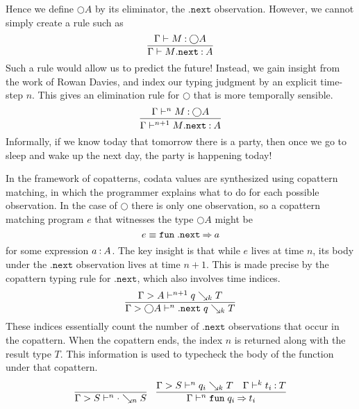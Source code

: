 \documentclass[11pt]{article}
\newcommand{\fun}{\mathtt{fun}}
\renewcommand{\circle}{\bigcirc}
\renewcommand{\next}{\mathtt{.next}}
\renewcommand{\synth}{\searrow}
\begin{document}
Hence we define $\circle A$ by its eliminator, the $\next$ observation.
However, we cannot simply create a rule such as
%
\begin{equation*}
  \infer{
    \Gamma \proves M\next \hastype A
  }{
    \Gamma \proves M \hastype \circle A
  }
\end{equation*}
%
Such a rule would allow us to predict the future!
%
Instead, we gain insight from the work of Rowan Davies\cite{davies-ltl}, and
index our typing judgment by an explicit time-step $n$.
This gives an elimination rule for $\circle$ that is more temporally sensible.
%
\begin{equation*}
  \infer{
    \Gamma \proves^{n+1} M\next \hastype A
  }{
    \Gamma \proves^n M \hastype \circle A
  }
\end{equation*}
%
Informally, if we know today that tomorrow there is a party, then once we go to
sleep and wake up the next day, the party is happening today!

In the framework of copatterns, codata values are synthesized using copattern
matching, in which the programmer explains what to do for each possible
observation.
In the case of $\circle$ there is only one observation, so a copattern matching
program $e$ that witnesses the type $\circle A$ might be
%
\begin{equation*}
  e \equiv \fun\;\next\goesto a
\end{equation*}
%
for some expression $a \mathbin{:} A$.
The key insight is that while $e$ lives at time $n$, its body under the $\next$
observation lives at time $n+1$.
This is made precise by the copattern typing rule for $\next$, which also
involves time indices.
%
\begin{equation*}
  \infer{
    \Gamma > \circle A \proves^n \next\; q \synth_k T
  }{
    \Gamma > A \proves^{n+1} q \synth_k T
  }
\end{equation*}
%
These indices essentially count the number of $\next$ observations that occur
in the copattern.
When the copattern ends, the index $n$ is returned along with the result type
$T$. This information is used to typecheck the body of the function under that
copattern.
%
\begin{equation*}
  \infer{\Gamma > S \proves^n \cdot \synth_n S}{}
  \quad
  \infer{
    \Gamma \proves^n \fun\; q_i \goesto t_i
  }{
    \Gamma > S \proves^n q_i \synth_k T
    &
    \Gamma \proves^k t_i \hastype T
  }
\end{equation*}
\end{document}
